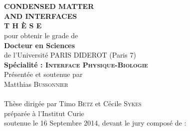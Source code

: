        \begin{center}
        \begin{minipage}{0.75\linewidth}
    \begin{center}
             \\ 
            \vspace*{0.3cm}
             \\
            \noindent \textbf{CONDENSED MATTER \\ AND INTERFACES} \\
            \vspace*{0.5cm}
            \noindent \Huge \textbf{T H È S E} \\
            \vspace*{0.3cm}
            \noindent \large {pour obtenir le grade de} \\
            \vspace*{0.3cm}
            \noindent \LARGE \textbf{Docteur en Sciences} \\
            \vspace*{0.3cm}
            \noindent \Large de l'Université PARIS DIDEROT (Paris 7) \\
            \noindent \Large \textbf{Spécialité : \textsc{Interface Physique-Biologie}}\\
            \vspace*{0.4cm}
            \noindent \large {Présentée et soutenue par\\}
            \noindent \LARGE Matthias \textsc{Bussonnier} \\
            \vspace*{0.8cm}
             \\
            \vspace*{0.8cm}
            \noindent \Large Thèse dirigée par Timo \textsc{Betz} et Cécile \textsc{Sykes} \\
            \vspace*{0.2cm}
            \noindent \Large préparée à l'Institut Curie \\
            \vspace*{0.2cm}
            \noindent \large soutenue le 16 Septembre 2014, devant le jury composé de :\\
            \vspace*{0.5cm}

\end{center}
\end{minipage}
\end{center}
